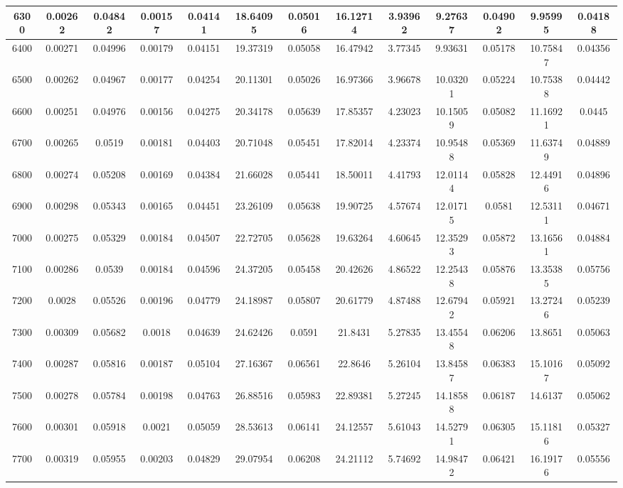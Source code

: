 \documentclass[conference]{IEEEtran}
\begin{document}
\begin{table}[!ht]
\begin{tabular}{|c|c|c|c|c|c|c|c|c|c|c|c|c|}
6300 & 0.00262 & 0.04842 & 0.00157 & 0.04141 & 18.64095 & 0.05016 & 16.12714 & 3.93962 &9.27637 & 0.04902 & 9.95995 & 0.04188 \\
\hline
6400 & 0.00271 & 0.04996 & 0.00179 & 0.04151 & 19.37319 & 0.05058 & 16.47942 & 3.77345 &9.93631 & 0.05178 & 10.75847 & 0.04356 \\
\hline
6500 & 0.00262 & 0.04967 & 0.00177 & 0.04254 & 20.11301 & 0.05026 & 16.97366 & 3.96678 &10.03201 & 0.05224 & 10.75388 & 0.04442 \\
\hline
6600 & 0.00251 & 0.04976 & 0.00156 & 0.04275 & 20.34178 & 0.05639 & 17.85357 & 4.23023 &10.15059 & 0.05082 & 11.16921 & 0.0445 \\
\hline
6700 & 0.00265 & 0.0519 & 0.00181 & 0.04403 & 20.71048 & 0.05451 & 17.82014 & 4.23374 &10.95488 & 0.05369 & 11.63749 & 0.04889 \\
\hline
6800 & 0.00274 & 0.05208 & 0.00169 & 0.04384 & 21.66028 & 0.05441 & 18.50011 & 4.41793 &12.01144 & 0.05828 & 12.44916 & 0.04896 \\
\hline
6900 & 0.00298 & 0.05343 & 0.00165 & 0.04451 & 23.26109 & 0.05638 & 19.90725 & 4.57674 &12.01715 & 0.0581 & 12.53111 & 0.04671 \\
\hline
7000 & 0.00275 & 0.05329 & 0.00184 & 0.04507 & 22.72705 & 0.05628 & 19.63264 & 4.60645 &12.35293 & 0.05872 & 13.16561 & 0.04884 \\
\hline
7100 & 0.00286 & 0.0539 & 0.00184 & 0.04596 & 24.37205 & 0.05458 & 20.42626 & 4.86522 &12.25438 & 0.05876 & 13.35385 & 0.05756 \\
\hline
7200 & 0.0028 & 0.05526 & 0.00196 & 0.04779 & 24.18987 & 0.05807 & 20.61779 & 4.87488 &12.67942 & 0.05921 & 13.27246 & 0.05239 \\
\hline
7300 & 0.00309 & 0.05682 & 0.0018 & 0.04639 & 24.62426 & 0.0591 & 21.8431 & 5.27835 &13.45548 & 0.06206 & 13.8651 & 0.05063 \\
\hline
7400 & 0.00287 & 0.05816 & 0.00187 & 0.05104 & 27.16367 & 0.06561 & 22.8646 & 5.26104 &13.84587 & 0.06383 & 15.10167 & 0.05092 \\
\hline
7500 & 0.00278 & 0.05784 & 0.00198 & 0.04763 & 26.88516 & 0.05983 & 22.89381 & 5.27245 &14.18588 & 0.06187 & 14.6137 & 0.05062 \\
\hline
7600 & 0.00301 & 0.05918 & 0.0021 & 0.05059 & 28.53613 & 0.06141 & 24.12557 & 5.61043 &14.52791 & 0.06305 & 15.11816 & 0.05327 \\
\hline
7700 & 0.00319 & 0.05955 & 0.00203 & 0.04829 & 29.07954 & 0.06208 & 24.21112 & 5.74692 &14.98472 & 0.06421 & 16.19176 & 0.05556 \\

\end{tabular}
\end{table}
\end{document}
